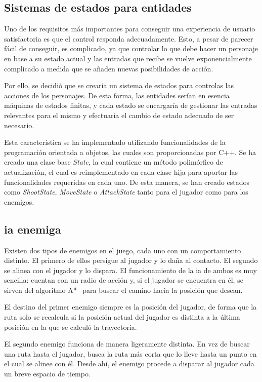	\subsection{Sistemas de estados para entidades}

		Uno de los requisitos más importantes para conseguir una experiencia de usuario satisfactoria es que el control responda adecuadamente. Esto, a pesar de parecer fácil de conseguir, es complicado, ya que controlar lo que debe hacer un personaje en base a su estado actual y las entradas que recibe se vuelve exponencialmente complicado a medida que se añaden nuevas posibilidades de acción.

		Por ello, se decidió que se crearía un sistema de estados para controlas las acciones de los personajes. De esta forma, las entidades serían en esencia máquinas de estados finitas, y cada estado se encargaría de gestionar las entradas relevantes para el mismo y efectuaría el cambio de estado adecuado de ser necesario.

		Esta característica se ha implementado utilizando funcionalidades de la programación orientada a objetos, las cuales son proporcionadas por C++. Se ha creado una clase base \textit{State}, la cual contiene un método polimórfico de actualización, el cual es reimplementado en cada clase hija para aportar las funcionalidades requeridas en cada uno. De esta manera, se han creado estados como \textit{ShootState}, \textit{MoveState} o \textit{AttackState} tanto para el jugador como para los enemigos.

	\subsection{\acrshort{ia} enemiga}

		Existen dos tipos de enemigos en el juego, cada uno con un comportamiento distinto. El primero de ellos persigue al jugador y lo daña al contacto. El segundo se alinea con el jugador y lo dispara. El funcionamiento de la \acrshort{ia} de ambos es muy sencilla: cuentan con un radio de acción y, si el jugador se encuentra en él, se sirven del algoritmo A*~\cite{astar} para buscar el camino hacia la posición que desean.

		El destino del primer enemigo siempre es la posición del jugador, de forma que la ruta solo se recalcula si la posición actual del jugador es distinta a la última posición en la que se calculó la trayectoria.

		El segundo enemigo funciona de manera ligeramente distinta. En vez de buscar una ruta hasta el jugador, busca la ruta más corta que lo lleve hasta un punto en el cual se alinee con él. Desde ahí, el enemigo procede a disparar al jugador cada un breve espacio de tiempo.

